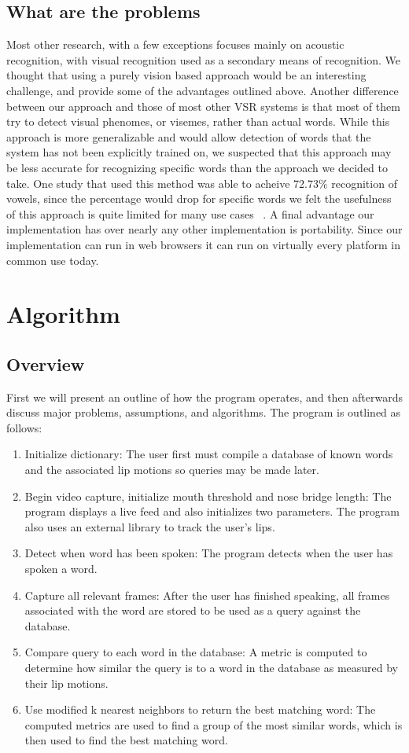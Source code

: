\documentclass[10pt,twocolumn,letterpaper]{article}
\begin{document}
\subsection{What are the problems}
Most other research, with a few exceptions focuses mainly on acoustic recognition, with visual recognition used as a secondary means of recognition. We thought that using a purely vision based approach would be an interesting challenge, and provide some of the advantages outlined above.
Another difference between our approach and those of most other VSR systems is that most of them try to detect visual phenomes, or visemes, rather than actual words.
While this approach is more generalizable and would allow detection of words that the system has not been explicitly trained on, we suspected that this approach may be less accurate for recognizing specific words than the approach we decided to take.
One study that used this method was able to acheive 72.73\% recognition of vowels, since the percentage would drop for specific words we felt the usefulness of this approach is quite limited for many use cases ~\cite{Viseme}.
A final advantage our implementation has over nearly any other implementation is portability. Since our implementation can run in web browsers it can run on virtually every platform in common use today.


\section{Algorithm}

\subsection{Overview}
First we will present an outline of how the program operates, and then afterwards discuss major problems, assumptions, and algorithms. The program is outlined as follows:
\begin{enumerate}
\item Initialize dictionary: The user first must compile a database of known words and the associated lip motions so queries may be made later.
\item Begin video capture, initialize mouth threshold and nose bridge length: The program displays a live feed and also initializes two parameters. The program also uses an external library to track the user’s lips.
\item Detect when word has been spoken: The program detects when the user has spoken a word.
\item Capture all relevant frames: After the user has finished speaking, all frames associated with the word are stored to be used as a query against the database.
\item Compare query to each word in the database: A metric is computed to determine how similar the query is to a word in the database as measured by their lip motions.
\item Use modified k nearest neighbors to return the best matching word: The computed metrics are used to find a group of the most similar words, which is then used to find the best matching word.
\end{enumerate}
\end{document}
